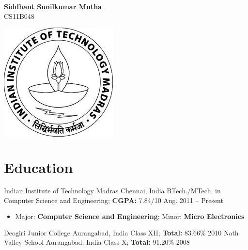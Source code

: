 \documentclass[letterpaper,11pt]{resume}
\author{Siddhant Sunilkumar Mutha}
\begin{document}


\raisebox{0ex}{
}

\noindent\begin{minipage}{\textwidth}
\begin{minipage}[c]{0.75\textwidth}
\textbf{\huge Siddhant Sunilkumar Mutha} \\

    {\large CS11B048} 

\end{minipage}\hfill
\begin{minipage}[c]{0.25\textwidth}
     \includegraphics[scale=0.25, right]{logo.png} 
\end{minipage}%
\end{minipage}


    

  \vspace{0.1in}

\section{Education}
\begin{itemize}
    \credential
    {{Indian Institute of Technology Madras}}
    {Chennai, India}
    {{BTech./MTech. in Computer Science
      and Engineering}; {{\bf CGPA:} 7.84/10}
      }
    {Aug. 2011 -- Present}
 { \begin{itemize}
      \item{Major: \textbf{Computer Science and Engineering}; Minor: \textbf{Micro Electronics}}
      \end{itemize}
    }
   \credential
    {{Deogiri Junior College}}
    {Aurangabad, India}
    {{Class XII}; {{\bf Total:} 83.66\%}
     }
    {2010}
    \bigskip
   \credential
    {{Nath Valley School}}
    {Aurangabad, India}
    {{Class X}; {{\bf Total:} 91.20\%}}
    {2008}
   \bigskip 

\end{itemize}
\end{document}
